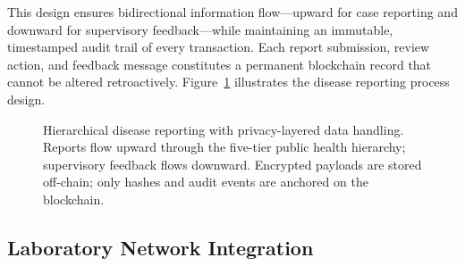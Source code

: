 \documentclass[AMA,LATO1COL]{WileyNJD-v2}
\begin{document}
This design ensures bidirectional information flow---upward for case reporting and downward for supervisory feedback---while maintaining an immutable, timestamped audit trail of every transaction. Each report submission, review action, and feedback message constitutes a permanent blockchain record that cannot be altered retroactively. Figure~\ref{fig:reporting} illustrates the disease reporting process design.

\begin{figure}[!ht]
\centering
{}
\caption{Hierarchical disease reporting with privacy-layered data handling. Reports flow upward through the five-tier public health hierarchy; supervisory feedback flows downward. Encrypted payloads are stored off-chain; only hashes and audit events are anchored on the blockchain.}\label{fig:reporting}
\end{figure}
%
%
%
%
%
%

\subsection{Laboratory Network Integration}\label{subsec:laboratory}
\end{document}
